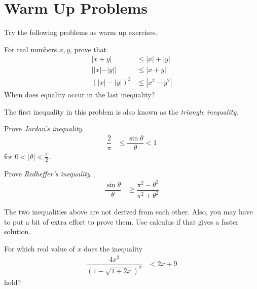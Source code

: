 \documentclass{subfile}
\begin{document}
	\section{Warm Up Problems}
	Try the following problems as warm up exercises.
		\begin{problem}
			For real numbers $x,y$, prove that
				\begin{align*}
					|x+y|
						& \leq|x|+|y|\\
					||x|-|y||
						& \leq|x+y|\\
					(|x|-|y|)^2
						& \leq|x^2-y^2|
				\end{align*}
			When does equality occur in the last inequality?
		\end{problem}
	The first inequality in this problem is also known as the \textit{triangle inequality}.
		\begin{problem}
			Prove \textit{Jordan's inequality}.
				\begin{align*}
					\dfrac{2}{\pi}
						& \leq\dfrac{\sin{\theta}}{\theta}<1
				\end{align*}
			for $0<|\theta|<\frac{\pi}{2}$.
		\end{problem}

		\begin{problem}
			Prove \textit{Redheffer's inequality}.
				\begin{align*}
					\dfrac{\sin{\theta}}{\theta}
						& \geq\dfrac{\pi^2-\theta^2}{\pi^2+\theta^2}
				\end{align*}
		\end{problem}
	The two inequalities above are not derived from each other. Also, you may have to put a bit of extra effort to prove them. Use calculus if that gives a faster solution.
		\begin{problem}
			For which real value of $x$ does the inequality
				\begin{align*}
					\dfrac{4x^2}{(1-\sqrt{1+2x})^2}
						& <2x+9
				\end{align*}
			hold?
		\end{problem}
\end{document}
